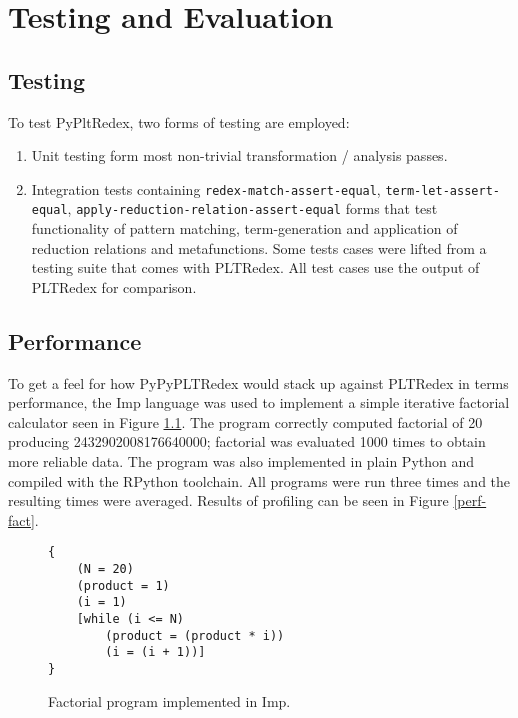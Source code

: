\chapter{Testing and Evaluation}

\section{Testing}

To test PyPltRedex, two forms of testing are employed: 

\begin{enumerate}
\item Unit testing form most non-trivial transformation / analysis passes.
\item Integration tests containing \texttt{redex-match-assert-equal}, \texttt{term-let-assert-equal}, \texttt{apply-reduction-relation-assert-equal} forms that test functionality of pattern matching, term-generation and application of reduction relations and metafunctions. Some tests cases were lifted from a testing suite that comes with PLTRedex. All test cases use the output of PLTRedex for comparison.
\end{enumerate}

\section{Performance}

To get a feel for how PyPyPLTRedex would stack up against PLTRedex in terms performance, the Imp language was used to implement a simple iterative factorial calculator seen in Figure \ref{imp-factorial}. The program correctly computed factorial of 20 producing 2432902008176640000; factorial was evaluated 1000 times to obtain more reliable data. The program was also implemented in plain Python and compiled with the RPython toolchain. All programs were run three times and the resulting times were averaged. Results of profiling can be seen in Figure \ref{perf-fact}.

\begin{figure}[h]
\begin{verbatim}
{
	(N = 20)
	(product = 1)
	(i = 1)
	[while (i <= N)
		(product = (product * i))
		(i = (i + 1))]
}
\end{verbatim}
\caption{Factorial program implemented in Imp.}
\label{imp-factorial}
\end{figure}

